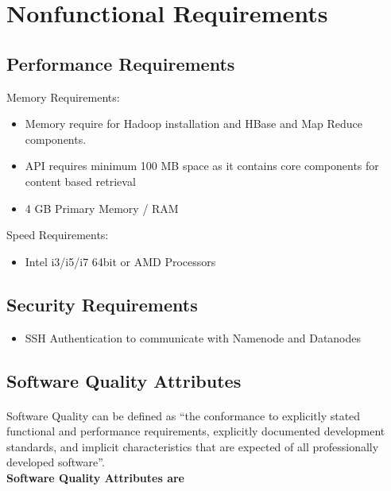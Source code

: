 \documentclass[11pt,letterpaper]{article}
\begin{document}
\section{Nonfunctional Requirements}

\subsection{Performance Requirements}
	
Memory Requirements:
\begin{itemize}	
\item Memory require for Hadoop installation and HBase and Map Reduce components.
\item API requires minimum 100 MB space as it contains core components for content based retrieval
\item 4 GB Primary Memory / RAM
\end{itemize}

Speed Requirements:
\begin{itemize}
\item Intel i3/i5/i7 64bit or AMD Processors
\end{itemize}

\subsection{Security Requirements}
\begin{itemize}
\item SSH Authentication to communicate with Namenode and Datanodes
\end{itemize}

\subsection{Software Quality Attributes}

\paragraph{}
Software Quality can be defined as “the conformance to explicitly stated functional and performance requirements, explicitly documented development standards, and implicit characteristics that are expected of all professionally developed software”.\\
	
\textbf{Software Quality Attributes are}
\end{document}
